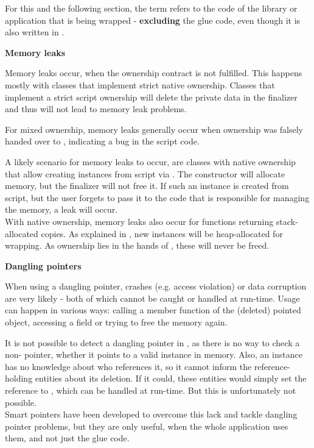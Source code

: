 For this and the following section, the term  refers to the code of the library or application that is being wrapped - \textbf{excluding} the glue code, even though it is also written in .

\textbf{Memory leaks}

Memory leaks occur, when the ownership contract is not fulfilled. This happens mostly with classes that implement strict native ownership. Classes that implement a strict script ownership will delete the private data in the finalizer and thus will not lead to memory leak problems.

For mixed ownership, memory leaks generally occur when ownership was falsely handed over to , indicating a bug in the script code.

A likely scenario for memory leaks to occur, are classes with native ownership that allow creating instances from script via . The constructor will allocate memory, but the finalizer will not free it. If such an instance is created from script, but the user forgets to pass it to the  code that is responsible for managing the memory, a leak will occur.\\
With native ownership, memory leaks also occur for functions returning stack-allocated copies. As explained in , new instances will be heap-allocated for wrapping. As ownership lies in the hands of , these will never be freed.

\textbf{Dangling pointers}

When using a dangling pointer, crashes (e.g. access violation) or data corruption are very likely - both of which cannot be caught or handled at run-time. Usage can happen in various ways: calling a member function of the (deleted) pointed object, accessing a field or trying to free the memory again.

It is not possible to detect a dangling pointer in , as there is no way to check a non- pointer, whether it points to a valid instance in memory. Also, an instance has no knowledge about who references it, so it cannot inform the reference-holding entities about its deletion. If it could, these entities would simply set the reference to , which can be handled at run-time. But this is unfortunately not possible.\\
Smart pointers have been developed to overcome this lack and tackle dangling pointer problems, but they are only useful, when the whole application uses them, and not just the glue code.

